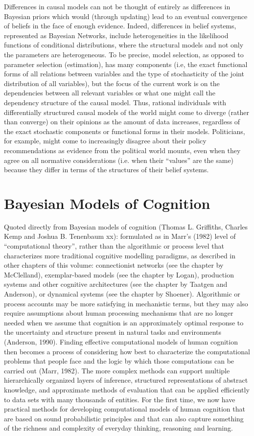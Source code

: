 \documentclass[12pt]{article}
\begin{document}
Differences in causal models can not be thought of entirely as differences in Bayesian priors which would (through updating) lead to an eventual convergence of beliefs in the face of enough evidence. Indeed, differences in belief systems, represented as Bayesian Networks, include heterogeneities in the likelihood functions of conditional distributions, where the structural models and not only the parameters are heterogeneous. To be precise, model selection, as opposed to parameter selection (estimation), has many components (i.e, the exact functional forms of all relations between variables and the type of stochasticity of the joint distribution of all variables), but the focus of the current work is on the dependencies between all relevant variables or what one might call the dependency structure of the causal model. Thus, rational individuals with differentially structured causal models of the world might come to diverge (rather than converge) on their opinions as the amount of data increases, regardless of the exact stochastic components or functional forms in their models. Politicians, for example, might come to increasingly disagree about their policy recommendations as evidence from the political world mounts, even when they agree on all normative considerations (i.e. when their ``values'' are the same) because they differ in terms of the structures of their belief systems.     

\section{Bayesian Models of Cognition}
Quoted directly from Bayesian models of cognition (Thomas L. Griffiths, Charles Kemp and Joshua B. Tenenbaum xx): formulated as in Marr’s (1982) level of ``computational theory'', rather than the algorithmic or process level that characterizes more traditional cognitive modelling paradigms, as described in other chapters of this volume: connectionist networks (see the chapter by McClelland), exemplar-based models (see the chapter by Logan), production systems and other cognitive architectures (see the chapter by Taatgen and Anderson), or dynamical systems (see the chapter by Shoener). Algorithmic or process accounts may be more satisfying in mechanistic terms, but they may also require assumptions about human processing mechanisms that are no longer needed when we assume that cognition is an approximately optimal response to the uncertainty and structure present in natural tasks and environments (Anderson, 1990). Finding effective computational models of human cognition then becomes a process of considering how best to characterize the computational problems that people face and the logic by which those computations can be carried out (Marr, 1982). The more complex methods can support multiple hierarchically organized layers of inference, structured representations of abstract knowledge, and approximate methods of evaluation that can be applied efficiently to data sets with many thousands of entities. For the first time, we now have practical methods for developing computational models of human cognition that are based on sound probabilistic principles and that can also capture something of the richness and complexity of everyday thinking, reasoning and learning.
\end{document}
